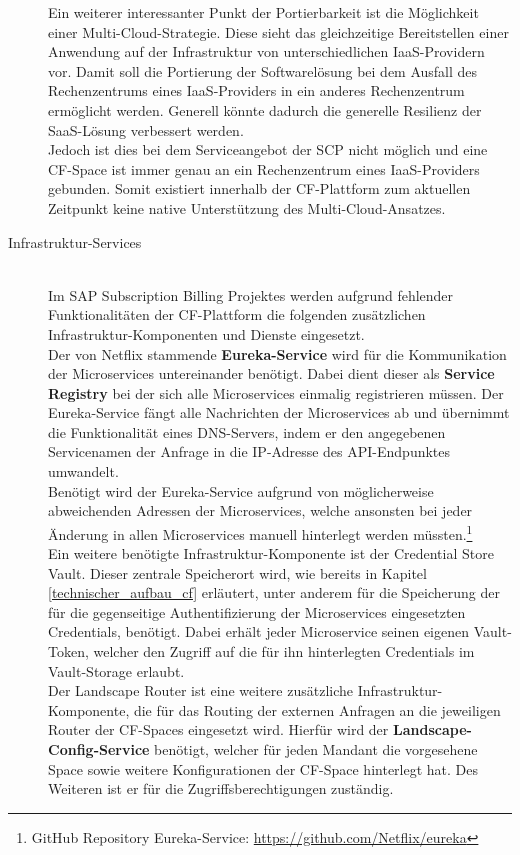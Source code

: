 \begin{description}
	Ein weiterer interessanter Punkt der Portierbarkeit ist die Möglichkeit einer Multi-Cloud-Strategie. Diese sieht das gleichzeitige Bereitstellen einer Anwendung auf der Infrastruktur von unterschiedlichen \ac{IaaS}-Providern vor. Damit soll die Portierung der Softwarelösung bei dem Ausfall des Rechenzentrums eines \ac{IaaS}-Providers in ein anderes Rechenzentrum ermöglicht werden. Generell könnte dadurch die generelle Resilienz der \ac{SaaS}-Lösung verbessert werden.\\
	Jedoch ist dies bei dem Serviceangebot der \ac{SCP} nicht möglich und eine \ac{CF}-Space ist immer genau an ein Rechenzentrum eines \ac{IaaS}-Providers gebunden. Somit existiert innerhalb der \ac{CF}-Plattform zum aktuellen Zeitpunkt keine native Unterstützung des Multi-Cloud-Ansatzes.\\
	\item[Infrastruktur-Services] \hfill \\
	Im SAP Subscription Billing Projektes werden aufgrund fehlender Funktionalitäten der \ac{CF}-Plattform die folgenden zusätzlichen Infrastruktur-Komponenten und Dienste eingesetzt.\\
	\newpage
	Der von Netflix stammende \textbf{Eureka-Service} wird für die Kommunikation der Microservices untereinander benötigt. Dabei dient dieser als \textbf{Service Registry} bei der sich alle Microservices einmalig registrieren müssen. Der Eureka-Service fängt alle Nachrichten der Microservices ab und übernimmt die Funktionalität eines \ac{DNS}-Servers, indem er den angegebenen Servicenamen der Anfrage in die \ac{IP}-Adresse des \ac{API}-Endpunktes umwandelt.\\ 
	Benötigt wird der Eureka-Service aufgrund von möglicherweise abweichenden Adressen der Microservices, welche ansonsten bei jeder Änderung in allen Microservices manuell hinterlegt werden müssten.\footnote{GitHub Repository Eureka-Service: \url{https://github.com/Netflix/eureka}}\\  
	Ein weitere benötigte Infrastruktur-Komponente ist der Credential Store Vault. Dieser zentrale Speicherort wird, wie bereits in Kapitel \ref{technischer_aufbau_cf} erläutert, unter anderem für die Speicherung der für die gegenseitige Authentifizierung der Microservices eingesetzten Credentials, benötigt. Dabei erhält jeder Microservice seinen eigenen Vault-Token, welcher den Zugriff auf die für ihn hinterlegten Credentials im Vault-Storage erlaubt.\\
	Der Landscape Router ist eine weitere zusätzliche Infrastruktur-Komponente, die für das Routing der externen Anfragen an die jeweiligen Router der \ac{CF}-Spaces eingesetzt wird. Hierfür wird der \textbf{Landscape-Config-Service} benötigt, welcher für jeden Mandant die vorgesehene Space sowie weitere Konfigurationen der \ac{CF}-Space hinterlegt hat. Des Weiteren ist er für die Zugriffsberechtigungen zuständig.\\

\end{description}
